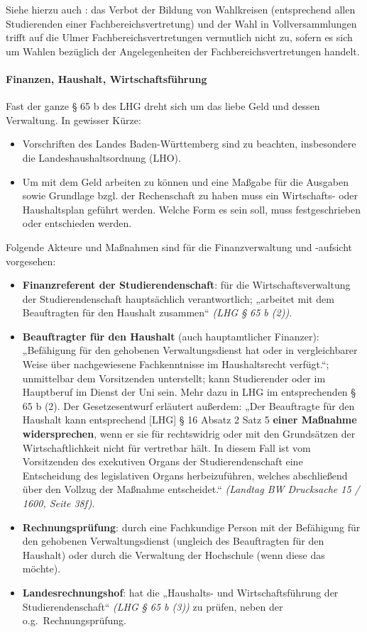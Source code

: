 \documentclass[
10pt,
a4paper,
twoside,								%
titlepage=false,							%
draft=false								%
]{scrartcl}
\begin{document}
Siehe hierzu auch : das Verbot der Bildung von Wahlkreisen (entsprechend allen Studierenden einer Fachbereichsvertretung) und der Wahl in Vollversammlungen trifft auf die Ulmer Fachbereichsvertretungen vermutlich nicht zu, sofern es sich um Wahlen bezüglich der Angelegenheiten der Fachbereichsvertretungen handelt.



\paragraph{Finanzen, Haushalt, Wirtschaftsführung\label{Glossar:Finanzen, Haushalt, Wirtschaftsführung}}

Fast der ganze § 65 b des LHG dreht sich um das liebe Geld und dessen Verwaltung. In gewisser Kürze:
\begin{itemize}
	\item Vorschriften des Landes Baden-Württemberg sind zu beachten, insbesondere die Landeshaushaltsordnung (LHO).
	\item Um mit dem Geld arbeiten zu können und eine Maßgabe für die Ausgaben sowie Grundlage bzgl. der Rechenschaft zu haben muss ein Wirtschafts- oder Haushaltsplan geführt werden. Welche Form es sein soll, muss festgeschrieben oder entschieden werden.
\end{itemize}

Folgende Akteure und Maßnahmen sind für die Finanzverwaltung und -aufsicht vorgesehen:
\begin{itemize}
	\item \textbf{Finanzreferent der Studierendenschaft}: für die Wirtschaftsverwaltung der Studierendenschaft hauptsächlich verantwortlich; „arbeitet mit dem Beauftragten für den Haushalt zusammen“ \textit{(LHG § 65 b (2))}.
	\item \textbf{Beauftragter für den Haushalt} (auch hauptamtlicher Finanzer): „Befähigung für den gehobenen Verwaltungsdienst hat oder in vergleichbarer Weise über nachgewiesene Fachkenntnisse im Haushaltsrecht verfügt.“; unmittelbar dem Vorsitzenden unterstellt; kann Studierender oder im Hauptberuf im Dienst der Uni sein. Mehr dazu in LHG im entsprechenden § 65 b (2). Der Gesetzesentwurf erläutert außerdem: „Der Beauftragte für den Haushalt kann entsprechend [LHG] § 16 Absatz 2 Satz 5 \textbf{einer Maßnahme widersprechen}, wenn er sie für rechtswidrig oder mit den Grundsätzen der Wirtschaftlichkeit nicht für vertretbar hält. In diesem Fall ist vom Vorsitzenden des exekutiven Organs der Studierendenschaft eine Entscheidung des legislativen Organs herbeizuführen, welches abschließend über den Vollzug der Maßnahme entscheidet.“ \textit{(Landtag BW Drucksache 15 / 1600, Seite 38f)}.
	\item \textbf{Rechnungsprüfung}: durch eine Fachkundige Person mit der Befähigung für den gehobenen Verwaltungsdienst (ungleich des Beauftragten für den Haushalt) oder durch die Verwaltung der Hochschule (wenn diese das möchte).
	\item \textbf{Landesrechnungshof}: hat die „Haushalts- und Wirtschaftsführung der Studierendenschaft“ \textit{(LHG § 65 b (3))} zu prüfen, neben der o.g.~Rechnungsprüfung.
\end{itemize}
\end{document}
